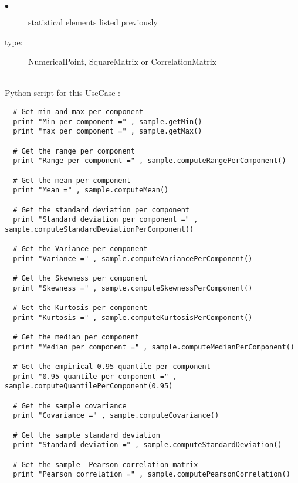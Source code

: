 {
  \begin{description}
  \item[$\bullet$] statistical elements listed previously
  \item[type:]  NumericalPoint, SquareMatrix or CorrelationMatrix
  \end{description}
}

\textspace\\
Python script for this UseCase :

\begin{lstlisting}
  # Get min and max per component
  print "Min per component =" , sample.getMin()
  print "max per component =" , sample.getMax()

  # Get the range per component
  print "Range per component =" , sample.computeRangePerComponent()

  # Get the mean per component
  print "Mean =" , sample.computeMean()

  # Get the standard deviation per component
  print "Standard deviation per component =" , sample.computeStandardDeviationPerComponent()

  # Get the Variance per component
  print "Variance =" , sample.computeVariancePerComponent()

  # Get the Skewness per component
  print "Skewness =" , sample.computeSkewnessPerComponent()

  # Get the Kurtosis per component
  print "Kurtosis =" , sample.computeKurtosisPerComponent()

  # Get the median per component
  print "Median per component =" , sample.computeMedianPerComponent()

  # Get the empirical 0.95 quantile per component
  print "0.95 quantile per component =" , sample.computeQuantilePerComponent(0.95)

  # Get the sample covariance
  print "Covariance =" , sample.computeCovariance()

  # Get the sample standard deviation
  print "Standard deviation =" , sample.computeStandardDeviation()

  # Get the sample  Pearson correlation matrix
  print "Pearson correlation =" , sample.computePearsonCorrelation()


\end{lstlisting}
